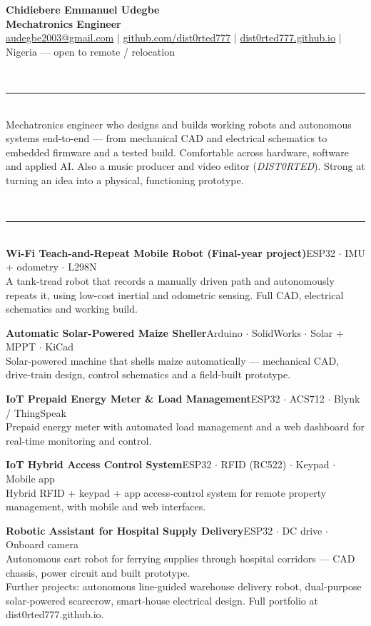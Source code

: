 \documentclass[11pt]{article}
\newcommand{\cvsection}[1]{%
  \vspace{8pt}{\color{accent}\bfseries\large #1}\\[-4pt]
  {\color{accent}\rule{\linewidth}{1.1pt}}\\[3pt]}
\newcommand{\project}[2]{%
  \textbf{#1}\hfill{\color{muted}\small #2}\\}
\begin{document}
{\Huge\bfseries Chidiebere Emmanuel Udegbe}\\[4pt]
{\large\color{accent}\bfseries Mechatronics Engineer}\\[6pt]
{\color{muted}
\href{mailto:audegbe2003@gmail.com}{audegbe2003@gmail.com} \;$\vert$\;
\href{https://github.com/dist0rted777}{github.com/dist0rted777} \;$\vert$\;
\href{https://dist0rted777.github.io}{dist0rted777.github.io} \;$\vert$\;
Nigeria --- open to remote / relocation}

\cvsection{Profile}
Mechatronics engineer who designs and builds working robots and autonomous systems
end-to-end --- from mechanical CAD and electrical schematics to embedded firmware and a
tested build. Comfortable across hardware, software and applied AI. Also a music producer
and video editor (\textit{DIST0RTED}). Strong at turning an idea into a physical,
functioning prototype.

\cvsection{Selected Projects}
\project{Wi-Fi Teach-and-Repeat Mobile Robot \textnormal{(Final-year project)}}{ESP32 $\cdot$ IMU + odometry $\cdot$ L298N}
A tank-tread robot that records a manually driven path and autonomously repeats it, using
low-cost inertial and odometric sensing. Full CAD, electrical schematics and working build.
\vspace{4pt}

\project{Automatic Solar-Powered Maize Sheller}{Arduino $\cdot$ SolidWorks $\cdot$ Solar + MPPT $\cdot$ KiCad}
Solar-powered machine that shells maize automatically --- mechanical CAD, drive-train design,
control schematics and a field-built prototype.
\vspace{4pt}

\project{IoT Prepaid Energy Meter \& Load Management}{ESP32 $\cdot$ ACS712 $\cdot$ Blynk / ThingSpeak}
Prepaid energy meter with automated load management and a web dashboard for real-time
monitoring and control.
\vspace{4pt}

\project{IoT Hybrid Access Control System}{ESP32 $\cdot$ RFID (RC522) $\cdot$ Keypad $\cdot$ Mobile app}
Hybrid RFID + keypad + app access-control system for remote property management, with mobile
and web interfaces.
\vspace{4pt}

\project{Robotic Assistant for Hospital Supply Delivery}{ESP32 $\cdot$ DC drive $\cdot$ Onboard camera}
Autonomous cart robot for ferrying supplies through hospital corridors --- CAD chassis, power
circuit and built prototype.
\\[2pt]
{\color{muted}\small Further projects: autonomous line-guided warehouse delivery robot, dual-purpose solar-powered scarecrow, smart-house electrical design. Full portfolio at dist0rted777.github.io.}
\end{document}
